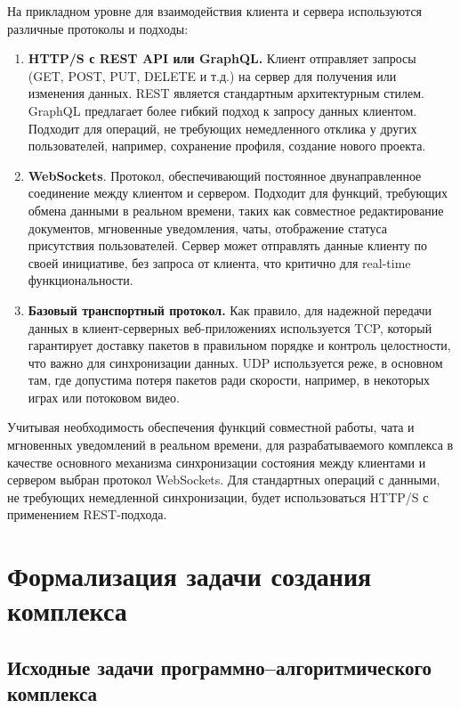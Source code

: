 На прикладном уровне для взаимодействия клиента и сервера используются различные протоколы и подходы:

\begin{enumerate}[wide=12.5mm, leftmargin=12.5mm]
\item \textbf{HTTP/S с REST API или GraphQL.} Клиент отправляет запросы (GET, POST, PUT, DELETE и т.д.) на сервер для получения или изменения данных. REST является стандартным архитектурным стилем. GraphQL предлагает более гибкий подход к запросу данных клиентом. Подходит для операций, не требующих немедленного отклика у других пользователей, например, сохранение профиля, создание нового проекта.
\item \textbf{WebSockets}. Протокол, обеспечивающий постоянное двунаправленное соединение между клиентом и сервером. Подходит для функций, требующих обмена данными в реальном времени, таких как совместное редактирование документов, мгновенные уведомления, чаты, отображение статуса присутствия пользователей. Сервер может отправлять данные клиенту по своей инициативе, без запроса от клиента, что критично для real-time функциональности.
\item \textbf{Базовый транспортный протокол.} Как правило, для надежной передачи данных в клиент-серверных веб-приложениях используется TCP, который гарантирует доставку пакетов в правильном порядке и контроль целостности, что важно для синхронизации данных. UDP используется реже, в основном там, где допустима потеря пакетов ради скорости, например, в некоторых играх или потоковом видео.
\end{enumerate}

Учитывая необходимость обеспечения функций совместной работы, чата и мгновенных уведомлений в реальном времени, для разрабатываемого комплекса в качестве основного механизма синхронизации состояния между клиентами и сервером выбран протокол WebSockets. 
Для стандартных операций с данными, не требующих немедленной синхронизации, будет использоваться HTTP/S с применением REST-подхода.

\section{Формализация задачи создания комплекса}

\subsection{Исходные задачи программно--алгоритмического комплекса}


